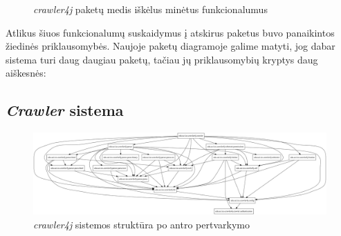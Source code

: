 \begin{figure}[H]
    \snugshade
    \endsnugshade
    \caption{\textit{crawler4j} paketų medis iškėlus minėtus funkcionalumus}
\end{figure}

Atlikus šiuos funkcionalumų suskaidymus į atskirus paketus buvo panaikintos žiedinės priklausomybės.
Naujoje paketų diagramoje galime matyti, jog dabar sistema turi daug daugiau paketų, tačiau jų priklausomybių kryptys daug aiškesnės:
\subsection{\textit{Crawler} sistema}
\begin{figure}[H]
    \centering
    \includegraphics[scale=0.2]{img/crawler_packages_v2}
    \caption{\textit{crawler4j} sistemos struktūra po antro pertvarkymo}
    \label{img:crawler_packages_v2}
\end{figure}


